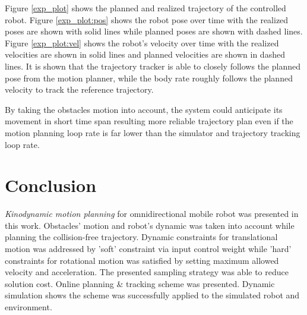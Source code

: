 \documentclass[conference]{IEEEtran}
\begin{document}
Figure \ref{exp_plot} shows the planned and realized trajectory of the controlled robot. Figure \ref{exp_plot:pos} shows the robot pose over time with the realized poses are shown with solid lines while planned poses are shown with dashed lines. Figure \ref{exp_plot:vel} shows the robot's velocity over time with the realized velocities are shown in solid lines and planned velocities are shown in dashed lines. It is shown that the trajectory tracker is able to closely follows the planned pose from the motion planner, while the body rate roughly follows the planned velocity to track the reference trajectory. 

By taking the obstacles motion into account, the system could anticipate its movement in short time span resulting more reliable trajectory plan even if the motion planning loop rate is far lower than the simulator and trajectory tracking loop rate.

\section{Conclusion} \label{conclusion}

\emph{Kinodynamic motion planning} for omnidirectional mobile robot was presented in this work. Obstacles' motion and robot's dynamic was taken into account while planning the collision-free trajectory. Dynamic constraints for translational motion was addressed by 'soft' constraint via input control weight while 'hard' constraints for rotational motion was satisfied by setting maximum allowed velocity and acceleration. The presented sampling strategy was able to reduce solution cost. Online planning \& tracking scheme was presented. Dynamic simulation shows the scheme was successfully applied to the simulated robot and environment.


\end{document}
